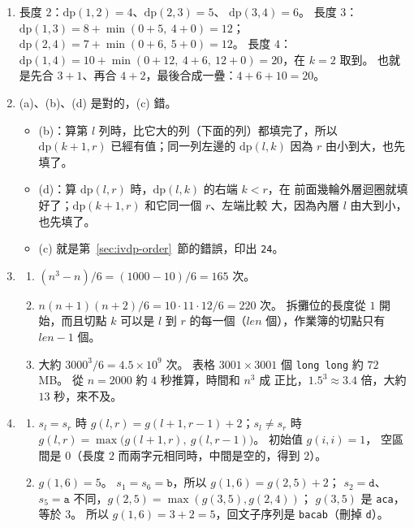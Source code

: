 \begin{enumerate}
\item 長度 $2$：$\mathrm{dp}(1, 2) = 4$、$\mathrm{dp}(2, 3) = 5$、
$\mathrm{dp}(3, 4) = 6$。 長度 $3$：$\mathrm{dp}(1, 3) = 8 + \min(0 + 5,\ 4 + 0) = 12$；
$\mathrm{dp}(2, 4) = 7 + \min(0 + 6,\ 5 + 0) = 12$。 長度 $4$：
$\mathrm{dp}(1, 4) = 10 + \min(0 + 12,\ 4 + 6,\ 12 + 0) = 20$，在 $k = 2$ 取到。
也就是先合 $3 + 1$、再合 $4 + 2$，最後合成一疊：$4 + 6 + 10 = 20$。

\item (a)、(b)、(d) 是對的，(c) 錯。
\begin{itemize}
\item (b)：算第 $l$ 列時，比它大的列（下面的列）都填完了，所以
$\mathrm{dp}(k + 1, r)$ 已經有值；同一列左邊的 $\mathrm{dp}(l, k)$ 因為
$r$ 由小到大，也先填了。
\item (d)：算 $\mathrm{dp}(l, r)$ 時，$\mathrm{dp}(l, k)$ 的右端 $k < r$，在
前面幾輪外層迴圈就填好了；$\mathrm{dp}(k + 1, r)$ 和它同一個 $r$、左端比較
大，因為內層 $l$ 由大到小，也先填了。
\item (c) 就是第~\ref{sec:ivdp-order}~節的錯誤，印出 \texttt{24}。
\end{itemize}

\item
\begin{enumerate}
\item $(n^3 - n)/6 = (1000 - 10)/6 = 165$ 次。
\item $n(n + 1)(n + 2)/6 = 10 \cdot 11 \cdot 12 / 6 = 220$ 次。 拆攤位的長度從
$1$ 開始，而且切點 $k$ 可以是 $l$ 到 $r$ 的每一個（$len$ 個），作業簿的切點只有
$len - 1$ 個。
\item 大約 $3000^3 / 6 = 4.5 \times 10^9$ 次。 表格 $3001 \times 3001$ 個
\texttt{long long} 約 $72$ MB。 從 $n = 2000$ 約 $4$ 秒推算，時間和 $n^3$ 成
正比，$1.5^3 \approx 3.4$ 倍，大約 $13$ 秒，來不及。
\end{enumerate}

\item
\begin{enumerate}
\item $s_l = s_r$ 時 $g(l, r) = g(l + 1, r - 1) + 2$；$s_l \ne s_r$ 時
$g(l, r) = \max\bigl(g(l + 1, r),\ g(l, r - 1)\bigr)$。 初始值 $g(i, i) = 1$，
空區間是 $0$（長度 $2$ 而兩字元相同時，中間是空的，得到 $2$）。
\item $g(1, 6) = 5$。 $s_1 = s_6 = \texttt{b}$，所以 $g(1, 6) = g(2, 5) + 2$；
$s_2 = \texttt{d}$、$s_5 = \texttt{a}$ 不同，$g(2, 5) = \max(g(3, 5), g(2, 4))$；
$g(3, 5)$ 是 \texttt{aca}，等於 $3$。 所以 $g(1, 6) = 3 + 2 = 5$，回文子序列是
\texttt{bacab}（刪掉 \texttt{d}）。
\end{enumerate}


\end{enumerate}
